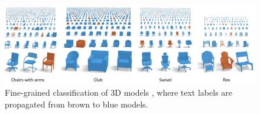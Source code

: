 \begin{figure}[bt]
\centering
    \includegraphics[width=1.0\columnwidth]{fig/search/huang_siga13_fine.png}
    \caption{
    Fine-grained classification of 3D models \cite{Huang:2013:FSL}, where text labels are propagated from brown to blue models. }
    \label{fig:fine-grained}
\end{figure}

